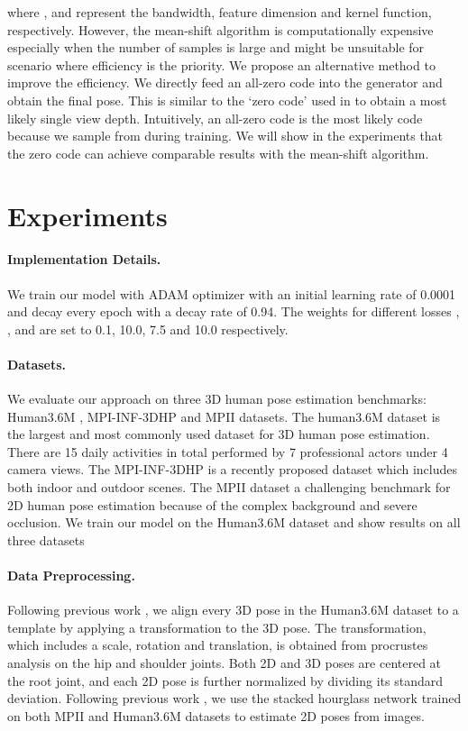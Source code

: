 \documentclass{bmvc2k}
\begin{document}
where ,  and  represent the bandwidth, feature dimension and kernel function, respectively.
However, the mean-shift algorithm is computationally expensive especially when the number of samples is large and might be unsuitable for scenario where efficiency is the priority. We propose an alternative method to improve the efficiency. We directly feed an all-zero code  into the generator and obtain the final pose. This is similar to the `zero code' used in \cite{zhi2019scenecode, bloesch2018codeslam} to obtain a most likely single view depth. Intuitively, an all-zero code is the most likely code because we sample  from  during training. 
We will show in the experiments that the zero code can achieve comparable results with the mean-shift algorithm.
\vspace{-4mm}

\section{Experiments}
\paragraph{Implementation Details.} We train our model with ADAM optimizer with an initial learning rate of 0.0001 and decay every epoch with a decay rate of 0.94. The weights for different losses , ,  and  are set to 0.1, 10.0, 7.5 and 10.0 respectively. 
 \vspace{-3mm}

\paragraph{Datasets.} We evaluate our approach on three 3D human pose estimation benchmarks: Human3.6M \cite{ionescu2013human3}, MPI-INF-3DHP \cite{mehta2017monocular} and MPII datasets\cite{andriluka20142d}. The human3.6M dataset is the largest and most commonly used dataset for 3D human pose estimation. There are 15 daily activities in total performed by 7 professional actors under 4 camera views. The MPI-INF-3DHP is a recently proposed dataset which includes both indoor and outdoor scenes. The MPII dataset a challenging benchmark for 2D human pose estimation because of the complex background and severe occlusion. We train our model on the Human3.6M dataset and show results on all three datasets
\vspace{-4mm}
\paragraph{Data Preprocessing.}  Following previous work \cite{Wandt2019RepNet}, we align every 3D pose in the Human3.6M dataset to a template by applying a transformation to the 3D pose. The transformation, which includes a scale, rotation and translation, is obtained from procrustes analysis on the hip and shoulder joints. Both 2D and 3D poses are centered at the root joint, and each 2D pose is further normalized by dividing its standard deviation. Following previous work \cite{Li_2019_CVPR, martinez2017simple}, we use the stacked hourglass network \cite{newell2016stacked} trained on both MPII and Human3.6M datasets to estimate 2D poses from images.
\end{document}
